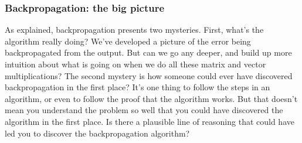 \subsubsection{Backpropagation: the big picture}
As explained, backpropagation presents two mysteries. First, what's the algorithm really doing? We've developed a picture of the error being backpropagated from the output. But can we go any deeper, and build up more intuition about what is going on when we do all these matrix and vector multiplications? The second mystery is how someone could ever have discovered backpropagation in the first place? It's one thing to follow the steps in an algorithm, or even to follow the proof that the algorithm works. But that doesn't mean you understand the problem so well that you could have discovered the algorithm in the first place. Is there a plausible line of reasoning that could have led you to discover the backpropagation algorithm?

